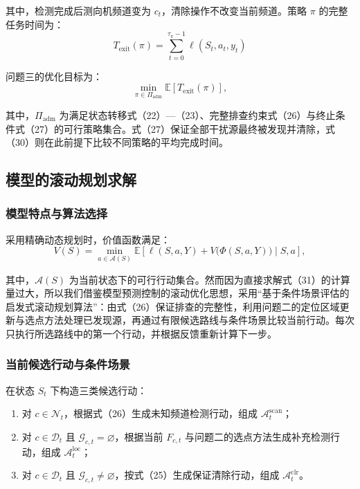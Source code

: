 其中，检测完成后测向机频道变为 \(c_t\)，清除操作不改变当前频道。策略 \(\pi\) 的完整任务时间为：
\[
T_{\mathrm{exit}}(\pi)
=
\sum_{t=0}^{\tau_\pi-1}\ell(S_t,a_t,y_t)
\tag{29}
\]

问题三的优化目标为：
\[
\min_{\pi\in\Pi_{\mathrm{adm}}}
\mathbb E\!\left[T_{\mathrm{exit}}(\pi)\right],
\tag{30}
\]

其中，\(\Pi_{\mathrm{adm}}\) 为满足状态转移式（22）---（23）、完整排查约束式（26）与终止条件式（27）的可行策略集合。式（27）保证全部干扰源最终被发现并清除，式（30）则在此前提下比较不同策略的平均完成时间。

\subsection{模型的滚动规划求解}

\subsubsection{模型特点与算法选择}

采用精确动态规划时，价值函数满足：
\[
V(S)
=
\min_{a\in\mathcal A(S)}
\mathbb E\!\left[
\ell(S,a,Y)+V\bigl(\Phi(S,a,Y)\bigr)
\mid S,a
\right],
\tag{31}
\]

其中，\(\mathcal A(S)\) 为当前状态下的可行行动集合。然而因为直接求解式（31）的计算量过大，所以我们借鉴模型预测控制的滚动优化思想，采用``基于条件场景评估的启发式滚动规划算法''：由式（26）保证排查的完整性，利用问题二的定位区域更新与选点方法处理已发现源，再通过有限候选路线与条件场景比较当前行动。每次只执行所选路线中的第一个行动，并根据反馈重新计算下一步。

\subsubsection{当前候选行动与条件场景}

在状态 \(S_t\) 下构造三类候选行动：

\begin{enumerate}
\def\labelenumi{\arabic{enumi}.}
\tightlist
\item
  对 \(c\in\mathcal N_t\)，根据式（26）生成未知频道检测行动，组成 \(\mathcal A_t^{\mathrm{scan}}\)；
\item
  对 \(c\in\mathcal D_t\) 且 \(\mathcal G_{c,t}=\varnothing\)，根据当前 \(F_{c,t}\) 与问题二的选点方法生成补充检测行动，组成 \(\mathcal A_t^{\mathrm{loc}}\)；
\item
  对 \(c\in\mathcal D_t\) 且 \(\mathcal G_{c,t}\ne\varnothing\)，按式（25）生成保证清除行动，组成 \(\mathcal A_t^{\mathrm{clr}}\)。
\end{enumerate}

